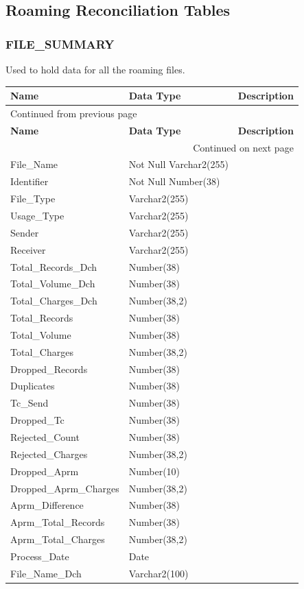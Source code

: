 \documentclass[12pt,twoside]{article}
\begin{document}
\normalsize

\subsection{Roaming Reconciliation Tables}
\label{sec:orgheadline162}
\subsubsection{FILE\_SUMMARY}
\label{sec:orgheadline159}
Used to hold data for all the roaming files.
\footnotesize
\begin{longtable}{l|l|l}
\hline
\textbf{Name} & \textbf{Data Type} & \textbf{Description}\\
\hline
\endfirsthead
\multicolumn{3}{l}{Continued from previous page} \\
\hline

\textbf{Name} & \textbf{Data Type} & \textbf{Description} \\

\hline
\endhead
\hline\multicolumn{3}{r}{Continued on next page} \\
\endfoot
\endlastfoot
\hline
File\_Name & Not Null Varchar2(255) & \\
Identifier & Not Null Number(38) & \\
File\_Type & Varchar2(255) & \\
Usage\_Type & Varchar2(255) & \\
Sender & Varchar2(255) & \\
Receiver & Varchar2(255) & \\
Total\_Records\_Dch & Number(38) & \\
Total\_Volume\_Dch & Number(38) & \\
Total\_Charges\_Dch & Number(38,2) & \\
Total\_Records & Number(38) & \\
Total\_Volume & Number(38) & \\
Total\_Charges & Number(38,2) & \\
Dropped\_Records & Number(38) & \\
Duplicates & Number(38) & \\
Tc\_Send & Number(38) & \\
Dropped\_Tc & Number(38) & \\
Rejected\_Count & Number(38) & \\
Rejected\_Charges & Number(38,2) & \\
Dropped\_Aprm & Number(10) & \\
Dropped\_Aprm\_Charges & Number(38,2) & \\
Aprm\_Difference & Number(38) & \\
Aprm\_Total\_Records & Number(38) & \\
Aprm\_Total\_Charges & Number(38,2) & \\
Process\_Date & Date & \\
File\_Name\_Dch & Varchar2(100) & \\
\hline
\end{longtable}
\end{document}

